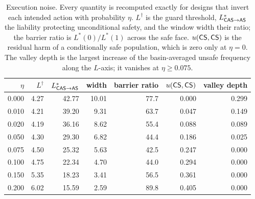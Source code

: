 \begin{table}[!ht]
\centering
\caption{Execution noise. Every quantity is recomputed exactly for designs that invert each intended action with probability $\eta$. $L^{\dagger}$ is the guard threshold, $L^{*}_{\textsf{CAS}\to\textsf{AS}}$ the liability protecting unconditional safety, and the window width their ratio; the barrier ratio is $L^{*}(0)/L^{*}(1)$ across the safe face. $u(\textsf{CS},\textsf{CS})$ is the residual harm of a conditionally safe population, which is zero only at $\eta=0$. The valley depth is the largest increase of the basin-averaged unsafe frequency along the $L$-axis; it vanishes at $\eta\ge0.075$.}
\label{tab:noise}
\begin{tabular}{rrrrrrr}
\toprule
$\eta$ & $L^{\dagger}$ & $L^{*}_{\textsf{CAS}\to\textsf{AS}}$ & width & barrier ratio & $u(\textsf{CS},\textsf{CS})$ & valley depth \\
\midrule
0.000 & 4.27 & 42.77 & 10.01 & 77.7 & 0.000 & 0.299 \\
0.010 & 4.21 & 39.20 & 9.31 & 63.7 & 0.047 & 0.149 \\
0.020 & 4.19 & 36.16 & 8.62 & 55.4 & 0.088 & 0.089 \\
0.050 & 4.30 & 29.30 & 6.82 & 44.4 & 0.186 & 0.025 \\
0.075 & 4.50 & 25.32 & 5.63 & 42.5 & 0.247 & 0.000 \\
0.100 & 4.75 & 22.34 & 4.70 & 44.0 & 0.294 & 0.000 \\
0.150 & 5.35 & 18.23 & 3.41 & 56.5 & 0.361 & 0.000 \\
0.200 & 6.02 & 15.59 & 2.59 & 89.8 & 0.405 & 0.000 \\
\bottomrule
\end{tabular}
\end{table}
